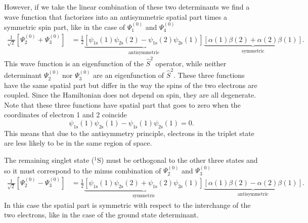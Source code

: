 \documentclass[../Main/chem331-notes.tex]{subfiles}
\begin{document}
However, if we take the linear combination of these two determinants we find a wave function that factorizes into an antisymmetric spatial part times a symmetric spin part, like in the case of $\Psi_1^{(0)}$ and $\Psi_4^{(0)}$
\begin{equation}
\begin{split}
 \frac{1}{\sqrt{2}}\left[\Psi_2^{(0)} + \Psi_3^{(0)} \right] & = 
\frac{1}{2} 
\underbrace{
\left[
\psi_\mathrm{1s}(1)
\psi_\mathrm{2s}(2)
-
\psi_\mathrm{1s}(2)
\psi_\mathrm{2s}(1)
\right]
}_{\textrm{antisymmetric}}
\underbrace{
\left[
\alpha(1)\beta(2)
+
\alpha(2)\beta(1)
\right]
}_{\textrm{symmetric}}.
\end{split}
\end{equation}
This wave function is an eigenfunction of the $\hat{S}^2$ operator, while neither determinant $\Psi_2^{(0)}$ nor $\Psi_3^{(0)}$ are an eigenfunction of  $\hat{S}^2$.
These three functions have the same spatial part but differ in the way the spins of the two electrons are coupled.
Since the Hamiltonian does not depend on spin, they are all degenerate.
Note that these three functions have spatial part that goes to zero when the coordinates of electron 1 and 2 coincide
\begin{equation}
\psi_\mathrm{1s}(1)
\psi_\mathrm{2s}(1)
-
\psi_\mathrm{1s}(1)
\psi_\mathrm{2s}(1) = 0.
\end{equation}
This means that due to the antisymmetry principle, electrons in the triplet state are less likely to be in the same region of space.

The remaining singlet state ($^1$S) must be orthogonal to the other three states and so it must correspond to the minus combination of $\Psi_2^{(0)}$ and $\Psi_3^{(0)}$
\begin{equation}
\begin{split}
 \frac{1}{\sqrt{2}}\left[\Psi_2^{(0)} - \Psi_3^{(0)} \right] & = 
\frac{1}{2} 
\underbrace{
\left[
\psi_\mathrm{1s}(1)
\psi_\mathrm{2s}(2)
+
\psi_\mathrm{1s}(2)
\psi_\mathrm{2s}(1)
\right]
}_{\textrm{symmetric}}
\underbrace{
\left[
\alpha(1)\beta(2)
-
\alpha(2)\beta(1)
\right]
}_{\textrm{antisymmetric}}.
\end{split}
\end{equation}
In this case the spatial part is symmetric with respect to the interchange of the two electrons, like in the case of the ground state determinant.
\end{document}

